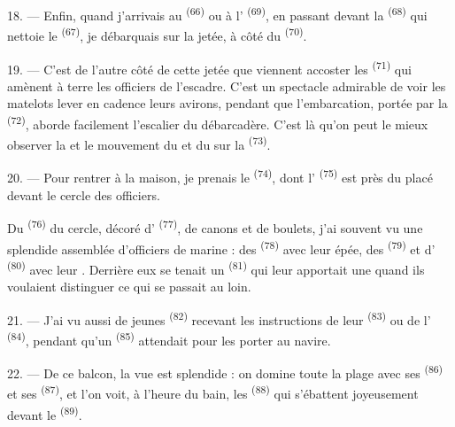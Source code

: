 18. --- Enfin, quand j'arrivais au  \textsuperscript{(66)}
ou à l' \textsuperscript{(69)}, en passant devant la
 \textsuperscript{(68)} qui nettoie le 
\textsuperscript{(67)}, je débarquais sur la jetée, à côté du
 \textsuperscript{(70)}.

19. --- C'est de l'autre côté de cette jetée que viennent accoster les
 \textsuperscript{(71)} qui amènent à terre les officiers de
l'escadre. C'est un spectacle admirable de voir les matelots lever en cadence
leurs avirons, pendant que l'embarcation, portée par la 
\textsuperscript{(72)}, aborde facilement l'escalier du débarcadère. C'est là
qu'on peut le mieux observer la  et le mouvement du 
et du  sur la  \textsuperscript{(73)}.

\VUsaut{3.0mm}
\VUsaut{3.0mm}

20. --- Pour rentrer à la maison, je prenais le 
\textsuperscript{(74)}, dont l' \textsuperscript{(75)} est près du
 placé devant le cercle des officiers.

Du  \textsuperscript{(76)} du cercle, décoré d'
\textsuperscript{(77)}, de canons et de boulets, j'ai souvent vu une splendide
assemblée d'officiers de marine : des 
\textsuperscript{(78)} avec leur épée, des 
\textsuperscript{(79)} et d' \textsuperscript{(80)} avec leur
. Derrière eux se tenait un 
\textsuperscript{(81)} qui leur apportait une  quand ils
voulaient distinguer ce qui se passait au loin.

21. --- J'ai vu aussi de jeunes  \textsuperscript{(82)}
recevant les instructions de leur 
\textsuperscript{(83)} ou de l' \textsuperscript{(84)}, pendant
qu'un  \textsuperscript{(85)} attendait pour les porter
au navire.

22. --- De ce balcon, la vue est splendide : on domine toute la plage avec ses
 \textsuperscript{(86)} et ses 
\textsuperscript{(87)}, et l'on voit, à l'heure du bain, les 
\textsuperscript{(88)} qui s'ébattent joyeusement devant le 
\textsuperscript{(89)}.

